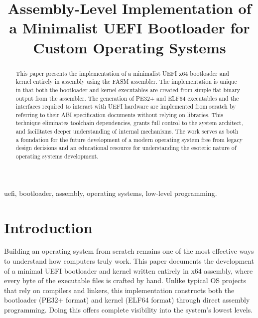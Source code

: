 \documentclass[conference]{IEEEtran}
\begin{document}
\title{Assembly-Level Implementation of a Minimalist UEFI Bootloader for Custom Operating Systems\\
}

\author{
}

\maketitle

\begin{abstract}
    This paper presents the implementation of a minimalist UEFI x64 bootloader and kernel entirely in assembly using the FASM assembler.
    The implementation is unique in that both the bootloader and kernel executables are created from simple flat binary output from the assembler. The generation of PE32+ and ELF64 executables and the interfaces required to interact with UEFI hardware are implemented from scratch by referring to their ABI specification documents without relying on libraries.
    This technique eliminates toolchain dependencies, grants full control to the system architect, and facilitates deeper understanding of internal mechanisms.
    The work serves as both a foundation for the future development of a modern operating system free from legacy design decisions and an educational resource for understanding the esoteric nature of operating systems development.
\end{abstract}

\begin{IEEEkeywords}
uefi, bootloader, assembly, operating systems, low-level programming.
\end{IEEEkeywords}

\section{Introduction}
Building an operating system from scratch remains one of the most effective ways to understand how computers truly work.
This paper documents the development of a minimal UEFI bootloader and kernel written entirely in x64 assembly, where every byte of the executable files is crafted by hand.
Unlike typical OS projects that rely on compilers and linkers, this implementation constructs both the bootloader (PE32+ format) and kernel (ELF64 format) through direct assembly programming. Doing this offers complete visibility into the system's lowest levels.
\end{document}
